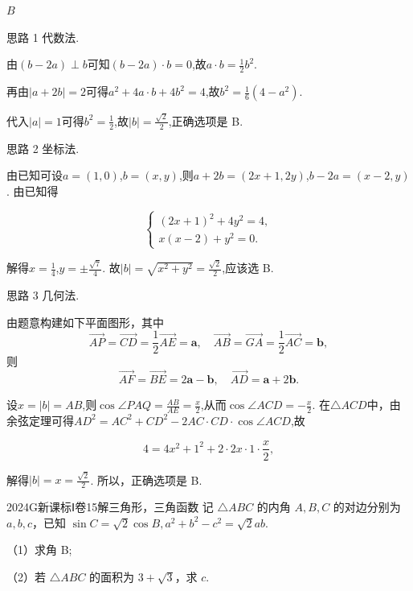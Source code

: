 \documentclass[12pt,UTF-8,a4paper]{ctexart}
\numberwithin{figure}{section}
\theoremstyle{mystyle}
\theoremstyle{mystylekaishu}
\theoremstyle{mystyle}
\numberwithin{xiti}{section}
\begin{document}
\begin{answer}
$B$
\end{answer}

\begin{solutions}
思路 1 代数法.

由$(b-2a) \perp b$可知$(b-2a) \cdot b=0$,故$a \cdot b=\frac{1}{2}b^2$.

再由$|a+2b|=2$可得$a^2+4a \cdot b+4b^2=4$,故$b^2=\frac{1}{6}(4-a^2)$.

代入$|a|=1$可得$b^2=\frac{1}{2}$,故$|b|=\frac{\sqrt{2}}{2}$,正确选项是 B.

思路 2 坐标法.

由已知可设$a=(1,0)$,$b=(x,y)$,则$a+2b=(2x+1,2y)$,$b-2a=(x-2,y)$. 由已知得

$$
\begin{cases} (2x+1)^2+4y^2=4, \\ x(x-2)+y^2=0. \end{cases}
$$

解得$x=\frac{1}{4}$,$y=\pm\frac{\sqrt{7}}{4}$. 故$|b|=\sqrt{x^2+y^2}=\frac{\sqrt{2}}{2}$,应该选 B.

思路 3 几何法.

由题意构建如下平面图形，其中
\[
\overrightarrow{AP}=\overrightarrow{CD}=\frac{1}{2}\overrightarrow{AE}=\boldsymbol{a},\quad
\overrightarrow{AB}=\overrightarrow{GA}=\frac{1}{2}\overrightarrow{AC}=\boldsymbol{b},
\]
则
\[
\overrightarrow{AF}=\overrightarrow{BE}=2\boldsymbol{a}-\boldsymbol{b},\quad
\overrightarrow{AD}=\boldsymbol{a}+2\boldsymbol{b}.
\]

设$x=|b|=AB$,则$\cos \angle PAQ=\frac{AB}{AE}=\frac{x}{2}$,从而$\cos \angle ACD=-\frac{x}{2}$. 在$\triangle ACD$中，由余弦定理可得$AD^2=AC^2+CD^2-2AC \cdot CD \cdot \cos \angle ACD$,故

$$
4=4x^2+1^2+2 \cdot 2x \cdot 1 \cdot \frac{x}{2},
$$

解得$|b|=x=\frac{\sqrt{2}}{2}$. 所以，正确选项是 B.
\end{solutions}


\begin{problem}{2024}{G}{新课标Ⅰ卷}{15}{解三角形，三角函数}
记 $\triangle ABC$ 的内角 $A,B,C$ 的对边分别为 $a,b,c$，已知 $\sin C=\sqrt{2}\cos B, a^2+b^2-c^2=\sqrt{2}ab$.

（1）求角 B;

（2）若 $\triangle ABC$ 的面积为 $3+\sqrt{3}$，求 $c$.
\end{problem}
\end{document}

